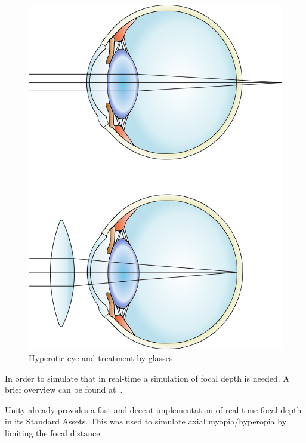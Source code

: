 \documentclass{sig-alternate-05-2015}
\begin{document}
\begin{figure}
    \centering
    \includegraphics[width=0.75\columnwidth]{hyperopia.png}
    \caption{Hyperotic eye and treatment by glasses.}
    \label{fig:hyperopia}
\end{figure}

In order to simulate that in real-time a simulation of focal depth is needed.
A brief overview can be found at~\cite{gpugems-DoF}.

Unity already provides a fast and decent implementation of real-time focal depth in its Standard Assets.
This was used to simulate axial myopia/hyperopia by limiting the focal distance.
\end{document}

